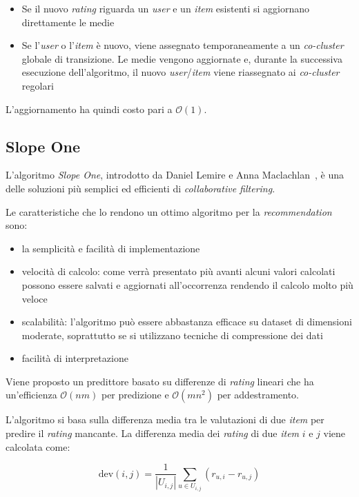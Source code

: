 \begin{itemize}
  \item Se il nuovo \textit{rating} riguarda un \textit{user} e un \textit{item} esistenti si aggiornano direttamente le medie
  \item Se l'\textit{user} o l'\textit{item} è nuovo, viene assegnato temporaneamente a un \textit{co-cluster} globale di transizione. Le medie vengono aggiornate e, durante la successiva esecuzione dell'algoritmo, il nuovo \textit{user}/\textit{item} viene riassegnato ai \textit{co-cluster} regolari
\end{itemize}

L'aggiornamento ha quindi costo pari a $\mathcal{O}(1)$.

\subsection{Slope One}\label{slopeone}

L'algoritmo \textit{Slope One}, introdotto da Daniel Lemire e Anna Maclachlan~\cite{SlopeOne}, è una delle soluzioni più semplici ed efficienti di \textit{collaborative filtering}.

Le caratteristiche che lo rendono un ottimo algoritmo per la \textit{recommendation} sono:
\begin{itemize}
    \item la semplicità e facilità di implementazione
    \item velocità di calcolo: come verrà presentato più avanti alcuni valori calcolati possono essere salvati e aggiornati all'occorrenza rendendo il calcolo molto più veloce
    \item scalabilità: l'algoritmo può essere abbastanza efficace su dataset di dimensioni moderate, soprattutto se si utilizzano tecniche di compressione dei dati
    \item facilità di interpretazione
\end{itemize}

Viene proposto un predittore basato su differenze di \textit{rating} lineari che ha un'efficienza $\mathcal{O}(nm)$ per predizione e $\mathcal{O}(mn^2)$ per addestramento.

L'algoritmo si basa sulla differenza media tra le valutazioni di due \textit{item} per predire il \textit{rating} mancante. La differenza media dei \textit{rating} di due \textit{item} $i$ e $j$ viene calcolata come:

\[
    \text{dev}(i, j) = \frac{1}{|U_{i,j}|} \sum\limits_{u \in U_{i,j}} (r_{u,i} - r_{u,j})
\]

